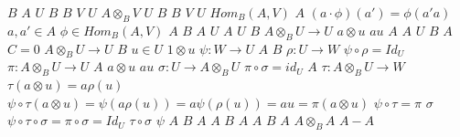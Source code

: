 \documentclass{article}
\begin{document}
$B$
$A$
$U$
$B$
$B$
$V$
$U$
$A\otimes_{B}V$
$U$
$B$
$B$
$V$
$U$
$Hom_{B}(A,V)$
$A$
$(a \cdot \phi)(a') = \phi(a'a)$
$a,a' \in A$
$\phi \in Hom_{B}(A,V)$
$A$
$B$
$A$
$U$
$A$
$U$
$B$
$A\otimes_{B}U \rightarrow U$
$a \otimes u$
$au$
$A$
$A$
$U$
$B$
$A$
$C=0$
$A \otimes_{B} U \rightarrow U$
$B$
$u \in U$
$1 \otimes u$
$\psi:W \rightarrow U$
$A$
$B$
$\rho:U\rightarrow W$
$\psi \circ \rho = Id_{U}$
$\pi:A\otimes_{B}U \rightarrow U$
$A$
$a\otimes u$
$au$
$\sigma:U\rightarrow A\otimes_{B}U$
$\pi \circ \sigma = id_{U}$
$A$
$\tau:A\otimes_{B}U \rightarrow W$
$\tau(a\otimes u) = a\rho(u)$
$\psi \circ \tau(a\otimes u) = \psi(a\rho(u))= a\psi(\rho(u)) = au = \pi(a\otimes u)$
$\psi \circ \tau = \pi$
$\sigma$
$\psi \circ\tau \circ \sigma = \pi \circ \sigma = Id_{U}$
$\tau \circ \sigma$
$\psi$
$A$
$B$
$A$
$A$
$B$
$A$
$A$
$B$
$A$
$A \otimes_{B} A$
$A-A$
\end{document}
